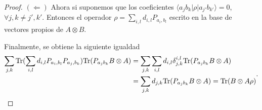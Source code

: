 \documentclass[12pt,oneside]{book}\raggedbottom{}
\begin{document}
\begin{proof}
	
$(\Leftarrow)$
Ahora si suponemos que los coeficientes  $\langle a_j b_k |\rho |a_{j'}b_{k'}\rangle=0$,  $\forall j,k\ne j',k'$. Entonces el operador $\rho =\sum_{i,l}d_{i,l}P_{a_i, b_l}$ escrito en la base de vectores propios de $A\otimes B$.

Finalmente, se obtiene la siguiente igualdad \[\begin{split}\sum_{j,k}{\rm Tr}( \sum_{i,l}d_{i,l}P_{a_i, b_l} P_{a_j,b_k}){\rm Tr}(P_{a_j b_k}B\otimes A )&=\sum_{j,k}\sum_{i,l}d_{i,l}\delta_{j,k}^{i,l}{\rm Tr}(P_{a_j b_k}B\otimes A )\\&=\sum_{j,k}d_{j,k}{\rm Tr}(P_{a_j b_k}B\otimes A)={\rm Tr}(B\otimes A\rho)\end{split}.\]


\end{proof}


\begin{comment}

Existen otras condiciones mucho más específicas y particulares que cumplen la equivalencia. Una de las que me parece más interesantes e intuitivas después de ver algunos ejemplos numéricos es que $A$ y $B$ sean dos operadores no degenerados y que conmuten puesto que conservarían cierta simetría, puesto que $A\otimes B$ y $B\otimes A$ compartirían el mismo espectro y el mismo conjunto de valores propios con la diferencia que los valores propios no serían asignados de igual forma a los vectores propios.


Bajo esta idea supongamos que: \begin{align}
    A&=\sum_i a_i |\psi_i\rala \psi_i|,& B&=\sum_i b_i |\psi_i\rala \psi_i|\\
    A\otimes B&= \sum_{j,k}a_j b_k |\psi_j\psi_k\rala\psi_j\psi_k|,&  B\otimes A&= \sum_{j,k}a_j b_k |\psi_k\psi_j\rala\psi_k\psi_j|.
\end{align}



Luego al sustituir en la ecuación de valor esperado del primer instrumento  {\ref{ExpectedValueI1}}:\begin{equation}\label{ExpectedValueI1.2}\la A\otimes B\ra_{\mathcal{I}_1}=\sum_{j,k}a_j b_k[p\la \psi_j \psi_k|\rho |\psi_j \psi_k\ra + (1-p)\la \psi_k \psi_j|\rho | \psi_k \psi_j\ra]. \end{equation}

Al sustituir en la ecuación de valor esperado del segundo instrumento {\ref{ExpectedValueI2}}:


\end{comment}
\end{document}
